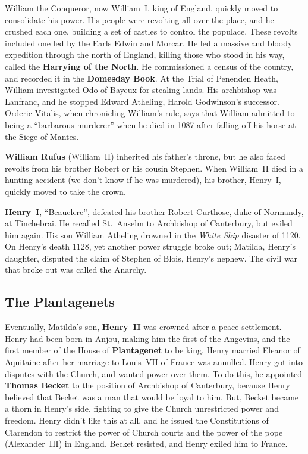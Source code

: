 William the Conqueror, now William~I, king of England, quickly moved to consolidate his power.
His people were revolting all over the place, and he crushed each one,
building a set of castles to control the populace.
These revolts included one led by the Earls Edwin and Morcar.
He led a massive and bloody expedition through the north of England,
killing those who stood in his way, called the \textbf{Harrying of the North}.
He commissioned a census of the country, and recorded it in the \textbf{Domesday Book}.
At the Trial of Penenden Heath, William investigated Odo of Bayeux for stealing lands.
His archbishop was Lanfranc, and he stopped Edward Atheling, Harold Godwinson's successor.
Orderic Vitalis, when chronicling William's rule, says that William admitted to being a ``barbarous murderer''
when he died in 1087 after falling off his horse at the Siege of Mantes.

\textbf{William Rufus} (William~II) inherited his father's throne,
but he also faced revolts from his brother Robert or his cousin Stephen.
When William~II died in a hunting accident (we don't know if he was murdered),
his brother, Henry~I, quickly moved to take the crown.

\textbf{Henry~I}, ``Beauclerc'', defeated his brother Robert Curthose, duke of Normandy, at Tinchebrai.
He recalled St.\ Anselm to Archbishop of Canterbury, but exiled him again.
His son William Atheling drowned in the \textit{White Ship} disaster of 1120.
On Henry's death 1128, yet another power struggle broke out;
Matilda, Henry's daughter, disputed the claim of Stephen of Blois, Henry's nephew.
The civil war that broke out was called the Anarchy.

\subsection*{The Plantagenets}

Eventually, Matilda's son, \textbf{Henry~II} was crowned after a peace settlement.
Henry had been born in Anjou, making him the first of the Angevins,
and the first member of the House of \textbf{Plantagenet} to be king.
Henry married Eleanor of Aquitaine after her marriage to Louis~VII of France was annulled.
Henry got into disputes with the Church, and wanted power over them.
To do this, he appointed \textbf{Thomas Becket} to the position of Archbishop of Canterbury,
because Henry believed that Becket was a man that would be loyal to him.
But, Becket became a thorn in Henry's side, fighting to give the Church unrestricted power and freedom.
Henry didn't like this at all, and he issued the Constitutions of Clarendon
to restrict the power of Church courts and the power of the pope (Alexander~III) in England.
Becket resisted, and Henry exiled him to France.

